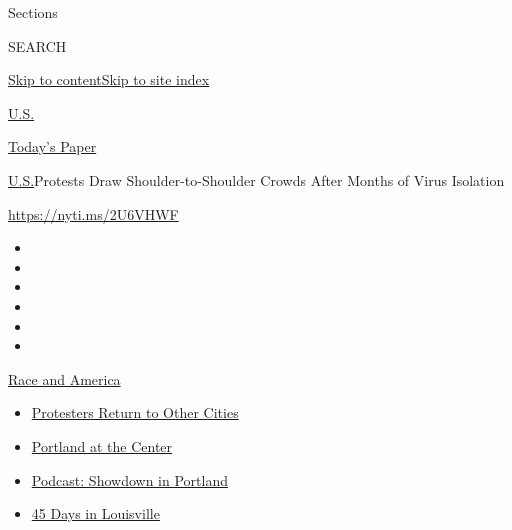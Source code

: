 Sections

SEARCH

\protect\hyperlink{site-content}{Skip to
content}\protect\hyperlink{site-index}{Skip to site index}

\href{https://www.nytimes.com/section/us}{U.S.}

\href{https://myaccount.nytimes.com/auth/login?response_type=cookie\&client_id=vi}{}

\href{https://www.nytimes.com/section/todayspaper}{Today's Paper}

\href{/section/us}{U.S.}\textbar{}Protests Draw Shoulder-to-Shoulder
Crowds After Months of Virus Isolation

\url{https://nyti.ms/2U6VHWF}

\begin{itemize}
\item
\item
\item
\item
\item
\item
\end{itemize}

\href{https://www.nytimes.com/news-event/george-floyd-protests-minneapolis-new-york-los-angeles?action=click\&pgtype=Article\&state=default\&region=TOP_BANNER\&context=storylines_menu}{Race
and America}

\begin{itemize}
\tightlist
\item
  \href{https://www.nytimes.com/2020/07/26/us/protests-portland-seattle-trump.html?action=click\&pgtype=Article\&state=default\&region=TOP_BANNER\&context=storylines_menu}{Protesters
  Return to Other Cities}
\item
  \href{https://www.nytimes.com/2020/07/24/us/portland-oregon-protests-white-race.html?action=click\&pgtype=Article\&state=default\&region=TOP_BANNER\&context=storylines_menu}{Portland
  at the Center}
\item
  \href{https://www.nytimes.com/2020/07/23/podcasts/the-daily/portland-protests.html?action=click\&pgtype=Article\&state=default\&region=TOP_BANNER\&context=storylines_menu}{Podcast:
  Showdown in Portland}
\item
  \href{https://www.nytimes.com/interactive/2020/07/16/us/black-lives-matter-protests-louisville-breonna-taylor.html?action=click\&pgtype=Article\&state=default\&region=TOP_BANNER\&context=storylines_menu}{45
  Days in Louisville}
\end{itemize}

